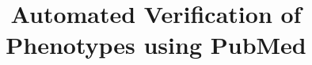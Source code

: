 \documentclass{sig-alternate-05-2015}
\begin{document}






%
\conferenceinfo{}{}

\title{Automated Verification of Phenotypes using PubMed}
%
%
%
%
%
\end{document}

